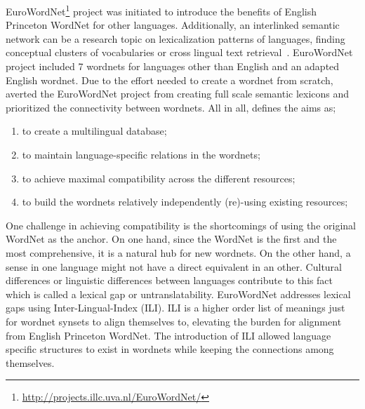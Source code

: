 EuroWordNet\footnote{\url{http://projects.illc.uva.nl/EuroWordNet/}} project was initiated to introduce the benefits of English Princeton WordNet for other languages.
Additionally, an interlinked semantic network can be a research topic on lexicalization patterns of languages, finding conceptual clusters of vocabularies or cross lingual text retrieval~\cite{gonzalo_applying_1998, vossen_introduction_1998}.
EuroWordNet project included 7 wordnets for languages other than English and an adapted English wordnet.
Due to the effort needed to create a wordnet from scratch, \citeauthor{vossen_introduction_1998} averted the EuroWordNet project from creating full scale semantic lexicons and prioritized the connectivity between wordnets.
All in all, \textcite{vossen_introduction_1998} defines the aims as;
\begin{displayquote}
    \begin{enumerate}
        \item to create a multilingual database;
        \item to maintain language-specific relations in the wordnets;
        \item to achieve maximal compatibility across the different resources;
        \item to build the wordnets relatively independently (re)-using existing resources;
    \end{enumerate}
\end{displayquote}

One challenge in achieving compatibility is the shortcomings of using the original WordNet as the anchor.
On one hand, since the WordNet is the first and the most comprehensive, it is a natural hub for new wordnets.
On the other hand, a sense in one language might not have a direct equivalent in an other.
Cultural differences or linguistic differences between languages contribute to this fact~\cite{kitamura_cultural_2009} which is called a lexical gap or untranslatability.
EuroWordNet addresses lexical gaps using Inter-Lingual-Index (ILI).
ILI is a higher order list of meanings just for wordnet synsets to align themselves to, elevating the burden for alignment from English Princeton WordNet.
The introduction of ILI allowed language specific structures to exist in wordnets while keeping the connections among themselves.

